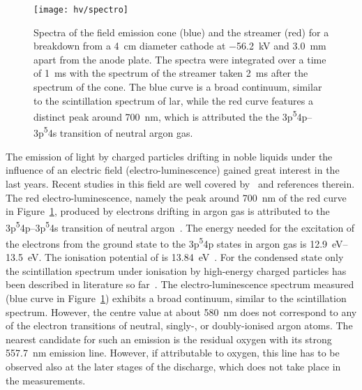 \begin{figure}[tbp]
	\centering
	\texttt{[image: hv/spectro]}
	\caption[ test field emission and streamer spectra]{%
		Spectra of the field emission cone (blue) and the streamer (red) for a breakdown from a \SI{4}{\centi\metre} diameter cathode at \SI{-56.2}{\kilo\volt} and \SI{3.0}{\milli\metre} apart from the anode plate.
		The spectra were integrated over a time of \SI{1}{\milli\second} with the spectrum of the streamer taken \SI{2}{\milli\second} after the spectrum of the cone.
		The blue curve is a broad continuum, similar to the scintillation spectrum of \acrshort{lar}, while the red curve features a distinct peak around \SI{700}{\nano\metre}, which is attributed the the 3p\textsuperscript{5}4p--3p\textsuperscript{5}4s transition of neutral argon gas.
	}
	\label{fig:hv_spectro}
\end{figure}

The emission of light by charged particles drifting in noble liquids under the influence of an electric field (electro-luminescence) gained great interest in the last years.
Recent studies in this field are well covered by~\cite{buzulutskov1, buzulutskov2, buzulutskov3} and references therein.
The red electro-luminescence, namely the peak around \SI{700}{\nano\metre} of the red curve in Figure~\ref{fig:hv_spectro}, produced by electrons drifting in argon gas is attributed to the 3p\textsuperscript{5}4p--3p\textsuperscript{5}4s transition of neutral argon~\cite{Boffard}.
The energy needed for the excitation of the electrons from the ground state to the 3p\textsuperscript{5}4p states in argon gas is \SIrange{12.9}{13.5}{\electronvolt}.
The ionisation potential of \lar{} is \SI{13.84}{\electronvolt}~\cite{2photonAbs}.
For the condensed state only the scintillation spectrum under ionisation by high-energy charged particles has been described in literature so far~\cite{Heindl}.
The electro-luminescence spectrum measured (blue curve in Figure~\ref{fig:hv_spectro}) exhibits a broad continuum, similar to the scintillation spectrum.
However, the centre value at about \SI{580}{\nano\metre} does not correspond to any of the electron transitions of neutral, singly-, or doubly-ionised argon atoms.
The nearest candidate for such an emission is the residual oxygen with its strong \SI{557.7}{\nano\metre} emission line.
However, if attributable to oxygen, this line has to be observed also at the later stages of the discharge, which does not take place in the measurements.

